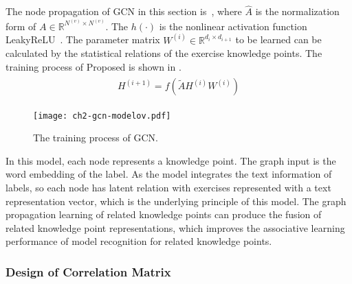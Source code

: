 
The node propagation of GCN in this section is~\eqname{\ref{fml:ch2-gcn2}}, where \(\widehat{A}\) is the normalization form of \(A\in \mathbb{R}^{N^{(v)}\times N^{(v)}}\). The \(h(\cdot)\) is the nonlinear activation function LeakyReLU~\cite{maas2013rectifier}. The parameter matrix \(W^{(i)}\in \mathbb{R}^{d_{i}\times d_{i+1}}\) to be learned can be calculated by the statistical relations of the exercise knowledge points. The training process of Proposed is shown in \figname{\ref{fig:ch2-gcn-explain}}.
\begin{align}
    \begin{split}
        H^{(i+1)} = f(\tilde{A}H^{(i)}W^{(i)})\label{fml:ch2-gcn2}
    \end{split}
\end{align}

\begin{figure}[htbp!]
    \centering
    \texttt{[image: ch2-gcn-modelov.pdf]}
    \caption{The training process of GCN.}\label{fig:ch2-gcn-explain}
\end{figure}

In this model, each node represents a knowledge point. The graph input is the word embedding of the label. As the model integrates the text information of labels, so each node has latent relation with exercises represented with a text representation vector, which is the underlying principle of this model. The graph propagation learning of related knowledge points can produce the fusion of related knowledge point representations, which improves the associative learning performance of model recognition for related knowledge points.

\subsubsection{Design of Correlation Matrix}

